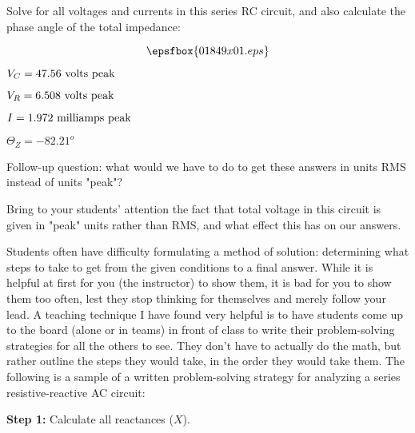 

Solve for all voltages and currents in this series RC circuit, and also calculate the phase angle of the total impedance:

$$\epsfbox{01849x01.eps}$$







$V_C = 47.56 \hbox{ volts peak}$

$V_R = 6.508 \hbox{ volts peak}$

$I = 1.972 \hbox{ milliamps peak}$

$\Theta_Z = -82.21^o$

\vskip 10pt

Follow-up question: what would we have to do to get these answers in units RMS instead of units "peak"?







Bring to your students' attention the fact that total voltage in this circuit is given in "peak" units rather than RMS, and what effect this has on our answers. 

\vskip 10pt

Students often have difficulty formulating a method of solution: determining what steps to take to get from the given conditions to a final answer.  While it is helpful at first for you (the instructor) to show them, it is bad for you to show them too often, lest they stop thinking for themselves and merely follow your lead.  A teaching technique I have found very helpful is to have students come up to the board (alone or in teams) in front of class to write their problem-solving strategies for all the others to see.  They don't have to actually do the math, but rather outline the steps they would take, in the order they would take them.  The following is a sample of a written problem-solving strategy for analyzing a series resistive-reactive AC circuit:

\vskip 10pt

\goodbreak

{\bf Step 1:} Calculate all reactances ($X$).

